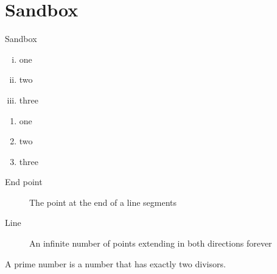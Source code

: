 \section{Sandbox}
\begin{frame}{Sandbox}
  \begin{enumerate}[(i)]
    \item one
    \item two
    \item three
  \end{enumerate}


  \begin{enumerate}[T \quad F \,]
    \item one
    \item two
    \item three
  \end{enumerate}

  \begin{description}
    \item[End point] The point at the end of a line segments
    \item[Line] An infinite number of points extending in both directions forever 
  \end{description}

  \begin{definition}
    A \alert{prime number} is a number that has exactly two divisors. 
  \end{definition}
\end{frame}

